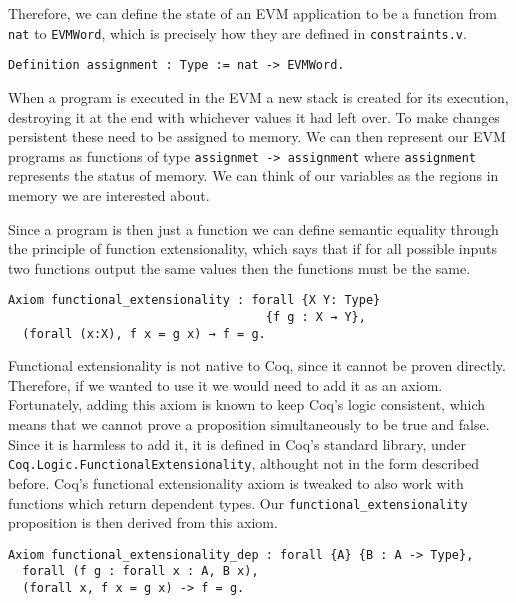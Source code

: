 Therefore, we can define the state of an EVM application to be a function from \texttt{nat} 
to \texttt{EVMWord}, which is precisely how they are defined in \verb|constraints.v|.

\begin{verbatim}
Definition assignment : Type := nat -> EVMWord.
\end{verbatim}

When a program is executed in the EVM a new stack is created for its execution, destroying it at the
end with whichever values it had left over. To make changes persistent these need to be assigned to
memory. We can then represent our EVM programs as functions of type
\texttt{assignmet -> assignment} where \texttt{assignment} represents the status of
memory. We can think of our variables as the regions in memory we are interested about.

Since a program is then just a function we can define semantic equality through the principle of
function extensionality, which says that if for all possible inputs two functions output the same
values then the functions must be the same.

\begin{verbatim}
Axiom functional_extensionality : forall {X Y: Type}
                                    {f g : X → Y},
  (forall (x:X), f x = g x) → f = g.
\end{verbatim}

Functional extensionality is not native to Coq, since it cannot be proven directly. Therefore, if we
wanted to use it we would need to add it as an axiom. Fortunately, adding this axiom is known to keep
Coq's logic consistent, which means that we cannot prove a proposition simultaneously to be true and 
false. Since it is harmless to add it, it is defined in Coq's standard library, under 
\texttt{Coq.Logic.FunctionalExtensionality}, althought not in the form described before. Coq's functional
extensionality axiom is tweaked to also work with functions which return dependent types. Our 
\texttt{functional_extensionality} proposition is then derived from this axiom.

\begin{verbatim}
Axiom functional_extensionality_dep : forall {A} {B : A -> Type},
  forall (f g : forall x : A, B x),
  (forall x, f x = g x) -> f = g.
\end{verbatim}

